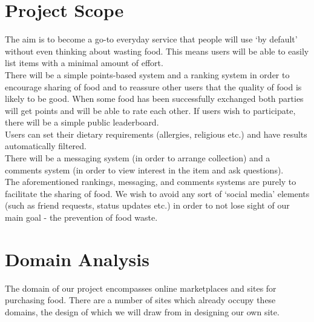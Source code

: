 \documentclass[12pt]{article}
\begin{document}
\section{Project Scope}
The aim is to become a go-to everyday service that people will use `by default'
without even thinking about wasting food. This means users will be able to
easily list items with a minimal amount of effort.\\
There will be a simple points-based system and a ranking system in order to
encourage sharing of food and to reassure other users that the quality of food is
likely to be good. When some food has been successfully exchanged both
parties will get points and will be able to rate each other. If users wish to
participate, there will be a simple public leaderboard.\\
Users can set their dietary requirements (allergies, religious etc.) and have
results automatically filtered. \\
There will be a messaging system (in order to arrange collection) and a comments
system (in order to view interest in the item and ask questions).\\
The aforementioned rankings, messaging, and comments systems are purely to facilitate the sharing of food.
We wish to avoid any sort of `social media' elements
(such as friend requests, status updates etc.) in order to not lose sight of our main goal - the prevention of food waste.


\section{Domain Analysis}

The domain of our project encompasses online marketplaces and sites for purchasing food.
There are a number of sites which already occupy these domains,
the design of which we will draw from in designing our own site.
\end{document}
